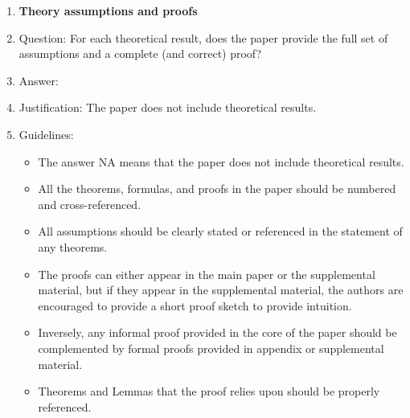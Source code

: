 \documentclass{article}
\begin{document}
\begin{enumerate}
\item {\bf Theory assumptions and proofs}
    \item[] Question: For each theoretical result, does the paper provide the full set of assumptions and a complete (and correct) proof?
    \item[] Answer: \answerNA{} %
    \item[] Justification: The paper does not include theoretical results.
    \item[] Guidelines:
    \begin{itemize}
        \item The answer NA means that the paper does not include theoretical results. 
        \item All the theorems, formulas, and proofs in the paper should be numbered and cross-referenced.
        \item All assumptions should be clearly stated or referenced in the statement of any theorems.
        \item The proofs can either appear in the main paper or the supplemental material, but if they appear in the supplemental material, the authors are encouraged to provide a short proof sketch to provide intuition. 
        \item Inversely, any informal proof provided in the core of the paper should be complemented by formal proofs provided in appendix or supplemental material.
        \item Theorems and Lemmas that the proof relies upon should be properly referenced. 
    \end{itemize}


\end{enumerate}
\end{document}
